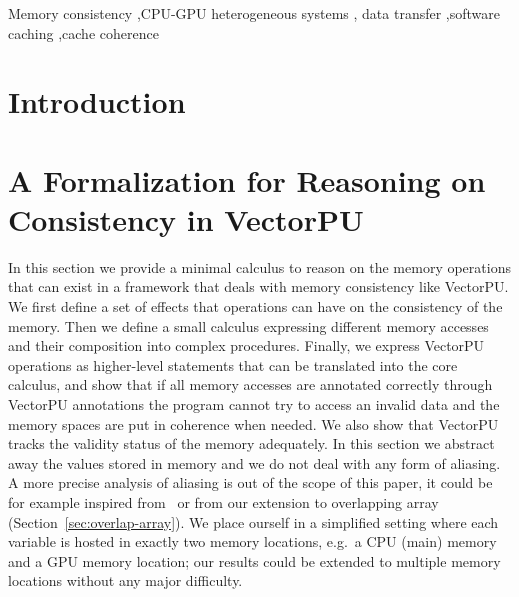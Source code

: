 \documentclass[preprint,12pt]{elsarticle}
\begin{document}
\begin{frontmatter}
\begin{abstract}
\end{abstract}

\begin{keyword}
Memory consistency \sep CPU-GPU heterogeneous systems \sep  
data transfer \sep  software caching \sep  cache coherence 


\end{keyword}

\end{frontmatter}

\section{Introduction}



\section{A Formalization for Reasoning on  Consistency in VectorPU}\label{sec:Formal}

In this section we provide a minimal calculus to reason on the memory operations that can 
exist in a framework that deals with memory consistency like VectorPU. We first define a 
set of effects that operations can have on the consistency of the memory. Then we define a 
small calculus expressing different memory accesses and their composition into complex 
procedures. Finally, we express VectorPU operations as higher-level statements that can 
be translated  into the core calculus, and show that if all memory 
accesses are annotated correctly through VectorPU annotations the program cannot try to 
access an invalid data and the memory spaces are put in coherence when needed. We also 
show that VectorPU tracks the validity status of the memory adequately. In this 
section we abstract away the values stored in memory and we 
do not deal with any form of aliasing. A more precise analysis of aliasing is 
out of the scope of this paper, it could be for example inspired 
from~\cite{Nielson1999} or from our extension to overlapping array (Section~\ref{sec:overlap-array}).
We place ourself in a simplified setting where each variable is hosted in exactly two 
memory locations, e.g.\ a CPU (main) memory and a GPU memory location; our results could be extended to multiple memory 
locations without any major difficulty.
\end{document}
